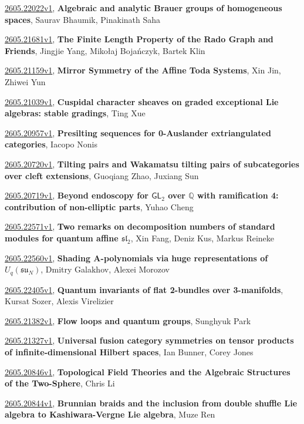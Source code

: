 \documentclass[9pt, a4paper]{article}
\theoremstyle{plain}
\theoremstyle{definition}
\theoremstyle{remark}
\newcommand{\arxiv}[3]{\href{https://arxiv.org/abs/#1}{#1}, \textbf{\textcolor{arxivblue}{#2}}, #3}
\begin{document}
\arxiv{2605.22022v1}{Algebraic and analytic Brauer groups of homogeneous spaces}{Saurav Bhaumik, Pinakinath Saha}

\arxiv{2605.21681v1}{The Finite Length Property of the Rado Graph and Friends}{Jingjie Yang, Mikołaj Bojańczyk, Bartek Klin}

\arxiv{2605.21159v1}{Mirror Symmetry of the Affine Toda Systems}{Xin Jin, Zhiwei Yun}

\arxiv{2605.21039v1}{Cuspidal character sheaves on graded exceptional Lie algebras: stable gradings}{Ting Xue}

\arxiv{2605.20957v1}{Presilting sequences for 0-Auslander extriangulated categories}{Iacopo Nonis}

\arxiv{2605.20720v1}{Tilting pairs and Wakamatsu tilting pairs of subcategories over cleft extensions}{Guoqiang Zhao, Juxiang Sun}

\arxiv{2605.20719v1}{Beyond endoscopy for $\mathsf{GL}_2$ over $\mathbb{Q}$ with ramification 4: contribution of non-elliptic parts}{Yuhao Cheng}

\arxiv{2605.22571v1}{Two remarks on decomposition numbers of standard modules for quantum affine $\mathfrak{sl}_2$}{Xin Fang, Deniz Kus, Markus Reineke}

\arxiv{2605.22560v1}{Shading A-polynomials via huge representations of $U_q(\mathfrak{su}_N)$}{Dmitry Galakhov, Alexei Morozov}

\arxiv{2605.22405v1}{Quantum invariants of flat 2-bundles over 3-manifolds}{Kursat Sozer, Alexis Virelizier}

\arxiv{2605.21382v1}{Flow loops and quantum groups}{Sunghyuk Park}

\arxiv{2605.21327v1}{Universal fusion category symmetries on tensor products of infinite-dimensional Hilbert spaces}{Ian Bunner, Corey Jones}

\arxiv{2605.20846v1}{Topological Field Theories and the Algebraic Structures of the Two-Sphere}{Chris Li}

\arxiv{2605.20844v1}{Brunnian braids and the inclusion from double shuffle Lie algebra to Kashiwara-Vergne Lie algebra}{Muze Ren}

\end{document}

